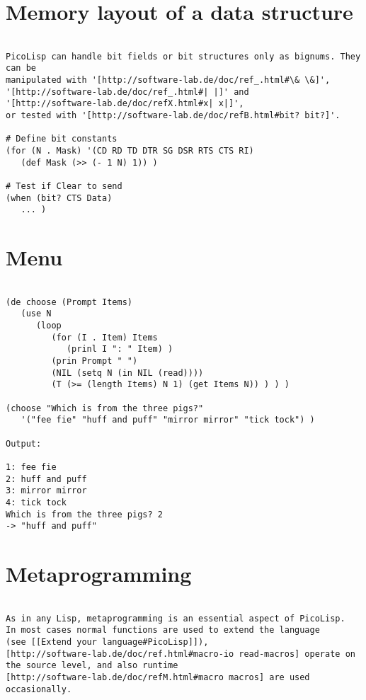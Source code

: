\section*{Memory layout of a data structure}

\begin{verbatim}

PicoLisp can handle bit fields or bit structures only as bignums. They can be
manipulated with '[http://software-lab.de/doc/ref_.html#\& \&]',
'[http://software-lab.de/doc/ref_.html#| |]' and
'[http://software-lab.de/doc/refX.html#x| x|]',
or tested with '[http://software-lab.de/doc/refB.html#bit? bit?]'.

# Define bit constants
(for (N . Mask) '(CD RD TD DTR SG DSR RTS CTS RI)
   (def Mask (>> (- 1 N) 1)) )

# Test if Clear to send
(when (bit? CTS Data)
   ... )

\end{verbatim}

\section*{Menu}

\begin{verbatim}

(de choose (Prompt Items)
   (use N
      (loop
         (for (I . Item) Items
            (prinl I ": " Item) )
         (prin Prompt " ")
         (NIL (setq N (in NIL (read))))
         (T (>= (length Items) N 1) (get Items N)) ) ) )

(choose "Which is from the three pigs?"
   '("fee fie" "huff and puff" "mirror mirror" "tick tock") )

Output:

1: fee fie
2: huff and puff
3: mirror mirror
4: tick tock
Which is from the three pigs? 2
-> "huff and puff"

\end{verbatim}

\section*{Metaprogramming}

\begin{verbatim}

As in any Lisp, metaprogramming is an essential aspect of PicoLisp.
In most cases normal functions are used to extend the language
(see [[Extend your language#PicoLisp]]),
[http://software-lab.de/doc/ref.html#macro-io read-macros] operate on
the source level, and also runtime
[http://software-lab.de/doc/refM.html#macro macros] are used occasionally.

\end{verbatim}

